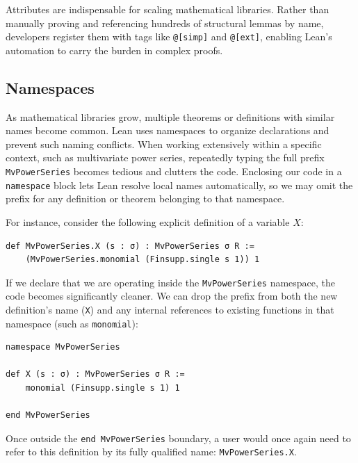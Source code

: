 Attributes are indispensable for scaling mathematical libraries.
Rather than manually proving and referencing hundreds of structural lemmas
by name, developers register them with tags like \lstinline|@[simp]| and
\lstinline|@[ext]|, enabling Lean's automation to carry the burden in complex
proofs.

\subsection{Namespaces}
\label{sec: namespace}


As mathematical libraries grow, multiple theorems or definitions with similar names become common. Lean uses namespaces to organize declarations and prevent such naming conflicts. When working extensively within a specific context, such as multivariate power series, repeatedly typing the full prefix \lstinline|MvPowerSeries| becomes tedious and clutters the code. Enclosing our code in a \lstinline|namespace| block lets Lean resolve local names automatically, so we may omit the prefix for any definition or theorem belonging to that namespace.

For instance, consider the following explicit definition of a variable $X$:

\begin{lstlisting}[language=Lean]
def MvPowerSeries.X (s : σ) : MvPowerSeries σ R :=
    (MvPowerSeries.monomial (Finsupp.single s 1)) 1
\end{lstlisting}

If we declare that we are operating inside the \lstinline|MvPowerSeries| namespace, the code becomes significantly cleaner. We can drop the prefix from both the new definition's name (\lstinline|X|) and any internal references to existing functions in that namespace (such as \lstinline|monomial|):

\begin{lstlisting}[language=Lean]
namespace MvPowerSeries

def X (s : σ) : MvPowerSeries σ R :=
    monomial (Finsupp.single s 1) 1

end MvPowerSeries
\end{lstlisting}

Once outside the \lstinline|end MvPowerSeries| boundary, a user would once again need to refer to this definition by its fully qualified name: \lstinline|MvPowerSeries.X|.

